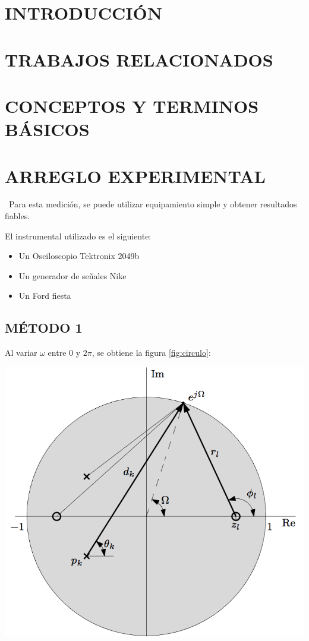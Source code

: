 \documentclass[]{article}
\makeatletter
\newenvironment{figurehere}		%
  {\def\@captype{figure}}		%
  {}							%
\makeatother
\begin{document}
\begin{multicols}{2}
\section{INTRODUCCIÓN}
\lipsum[2]
\section{TRABAJOS RELACIONADOS}
\lipsum[3]
\section{CONCEPTOS Y TERMINOS BÁSICOS}
\lipsum[4]
\section{ARREGLO EXPERIMENTAL}
\lipsum[5]
\
Para esta medición, se puede utilizar equipamiento simple y obtener resultados fiables.

El instrumental utilizado es el siguiente:
\begin{itemize}
  \item Un Osciloscopio Tektronix 2049b
  \item Un generador de señales Nike
  \item Un Ford fiesta
\end{itemize}
\subsection{MÉTODO 1}
\lipsum[6]
Al variar $\omega$ entre $0$ y $2 \pi$, se obtiene la figura \ref{fig:circulo}:

\begin{figurehere}
 \centering
 \includegraphics[width=\linewidth]{lathi}
 \label{fig:circulo}
\end{figurehere}


\end{multicols}
\end{document}
